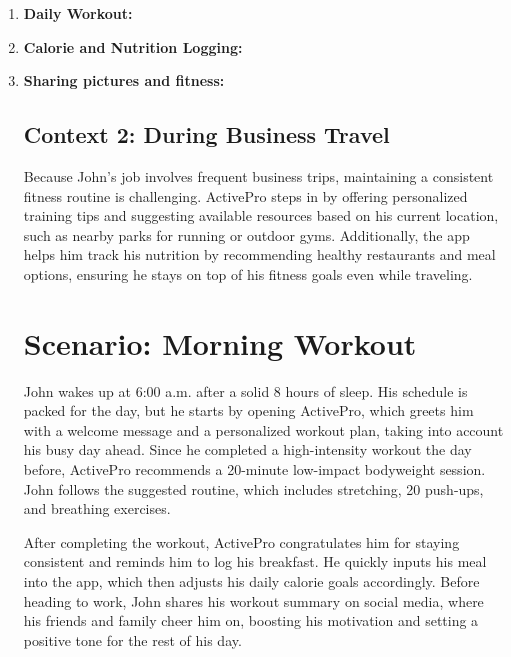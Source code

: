 \documentclass[letterpaper,11pt]{texMemo} %
\begin{document}
\begin{enumerate}
	
	\item \bf{Daily Workout:}
	
	\item  \bfseries{Calorie and Nutrition Logging:}
	
	\item  \bf{Sharing pictures and fitness:}  


\subsection{Context 2: During Business Travel  }
Because John's job involves frequent business trips, maintaining a consistent fitness routine is challenging. ActivePro steps in by offering personalized training tips and suggesting available resources based on his current location, such as nearby parks for running or outdoor gyms. Additionally, the app helps him track his nutrition by recommending healthy restaurants and meal options, ensuring he stays on top of his fitness goals even while traveling.

\section{Scenario: Morning Workout}

John wakes up at 6:00 a.m. after a solid 8 hours of sleep. His schedule is packed for the day, but he starts by opening ActivePro, which greets him with a welcome message and a personalized workout plan, taking into account his busy day ahead. Since he completed a high-intensity workout the day before, ActivePro recommends a 20-minute low-impact bodyweight session. John follows the suggested routine, which includes stretching, 20 push-ups, and breathing exercises.

After completing the workout, ActivePro congratulates him for staying consistent and reminds him to log his breakfast. He quickly inputs his meal into the app, which then adjusts his daily calorie goals accordingly. Before heading to work, John shares his workout summary on social media, where his friends and family cheer him on, boosting his motivation and setting a positive tone for the rest of his day.


\end{enumerate}
\end{document}
